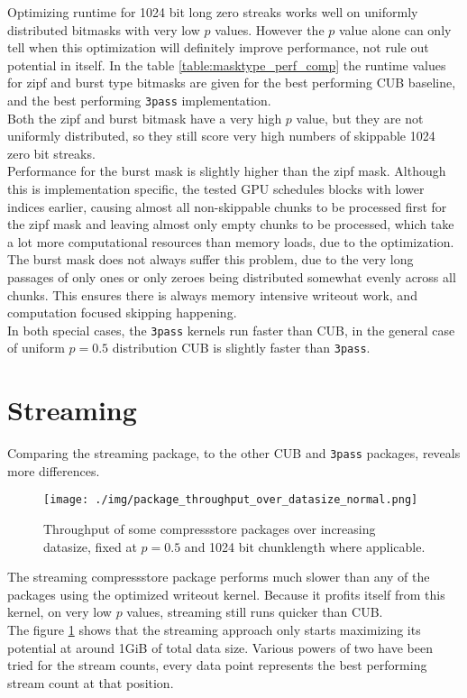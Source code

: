 \documentclass{tudscrreprt}
\begin{document}
			Optimizing runtime for 1024 bit long zero streaks works well on uniformly distributed bitmasks with very low $p$ values. However the $p$ value alone can only tell when this optimization will definitely improve performance, not rule out potential in itself. In the table \ref{table:masktype_perf_comp} the runtime values for zipf and burst type bitmasks are given for the best performing CUB baseline, and the best performing \texttt{3pass} implementation. \\
			Both the zipf and burst bitmask have a very high $p$ value, but they are not uniformly distributed, so they still score very high numbers of skippable 1024 zero bit streaks. \\
			Performance for the burst mask is slightly higher than the zipf mask. Although this is implementation specific, the tested GPU schedules blocks with lower indices earlier, causing almost all non-skippable chunks to be processed first for the zipf mask and leaving almost only empty chunks to be processed, which take a lot more computational resources than memory loads, due to the optimization. The burst mask does not always suffer this problem, due to the very long passages of only ones or only zeroes being distributed somewhat evenly across all chunks. This ensures there is always memory intensive writeout work, and computation focused skipping happening. \\
			In both special cases, the \texttt{3pass} kernels run faster than CUB, in the general case of uniform $p=0.5$ distribution CUB is slightly faster than \texttt{3pass}.
		
		\section{Streaming}
			Comparing the streaming package, to the other CUB and \texttt{3pass} packages, reveals more differences. \\
			
			\begin{figure}[!ht]
				\centering
				\texttt{[image: ./img/package\_throughput\_over\_datasize\_normal.png]}
				\caption{\label{fig:package_throughput_over_datasize_normal}Throughput of some compressstore packages over increasing datasize, fixed at $p=0.5$ and 1024 bit chunklength where applicable.}
			\end{figure}
			
			The streaming compressstore package performs much slower than any of the packages using the optimized writeout kernel. Because it profits itself from this kernel, on very low $p$ values, streaming still runs quicker than CUB. \\
			The figure \ref{fig:package_throughput_over_datasize_normal} shows that the streaming approach only starts maximizing its potential at around 1GiB of total data size. Various powers of two have been tried for the stream counts, every data point represents the best performing stream count at that position. \\
			
\end{document}
